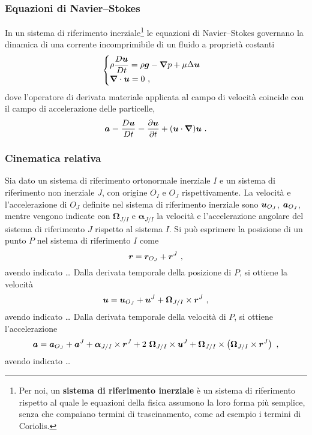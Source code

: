 
\subsubsection{Equazioni di Navier--Stokes}
In un sistema di riferimento inerziale\footnote{
  Per noi, un \textbf{sistema di riferimento inerziale} è un sistema di riferimento rispetto al quale le equazioni della fisica assumono la loro forma più semplice, senza che compaiano termini di trascinamento, come ad esempio i termini di Coriolis.
}
le equazioni di Navier--Stokes governano la dinamica di una corrente incomprimibile di un fluido a proprietà costanti 
\begin{equation}
\begin{cases}
 \rho \dfrac{D \bm{u}}{D t} = \rho \bm{g} - \bm{\nabla} p + \mu \Delta \bm{u} \\
 \bm{\nabla} \cdot \bm{u} = 0 \ ,
\end{cases}
\end{equation}
dove l'operatore di derivata materiale applicata al campo di velocità coincide con il campo di accelerazione delle particelle,
\begin{equation}
 \bm{a} = \dfrac{D \bm{u}}{D t} = \dfrac{\partial \bm{u}}{\partial t} + ( \bm{u} \cdot \bm{\nabla} ) \bm{u} \ .
\end{equation}

\subsubsection{Cinematica relativa}
Sia dato un sistema di riferimento ortonormale inerziale $I$ e un sistema di riferimento non inerziale $J$, con origine $O_I$ e $O_J$ rispettivamente. La velocità e l'accelerazione di $O_J$ definite nel sistema di riferimento inerziale sono $\bm{u}_{O_J}$, $\bm{a}_{O_J}$, mentre vengono indicate con $\bm{\Omega}_{J/I}$ e $\bm{\alpha}_{J/I}$ la velocità e l'accelerazione angolare del sistema di riferimento $J$ rispetto al sistema $I$. Si può esprimere la posizione di un punto $P$ nel sistema di riferimento $I$ come
\begin{equation}\label{eqn:rel:pos}
 \bm{r} = \bm{r}_{O_J} + \bm{r}^J \ ,
\end{equation}
avendo indicato \dots
Dalla derivata temporale della posizione di $P$, si ottiene la velocità
\begin{equation}\label{eqn:rel:vel}
 \vel = \vel_{O_J} + \vel^J + \bm{\Omega}_{J/I} \times \pos^J \ ,
\end{equation}
avendo indicato \dots
Dalla derivata temporale della velocità di $P$, si ottiene l'accelerazione
\begin{equation}\label{eqn:rel:acc}
 \bm{a} = \bm{a}_{O_J} + \bm{a}^J + \bm{\alpha}_{J/I} \times \bm{r}^J + 2~\bm{\Omega}_{J/I} \times \bm{u}^J + 
   \bm{\Omega}_{J/I} \times \left( \bm{\Omega}_{J/I} \times \bm{r}^J \right) \ ,
\end{equation}
avendo indicato \dots

